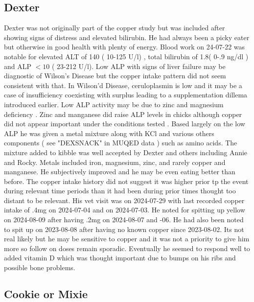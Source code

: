 \mjmcasetab

\subsection{Dexter}

\mjmdextercu

Dexter was not originally part of the copper study  but was included after
showing signs of distress and elevated bilirubin.  
He had always been a picky eater but otherwise in good
health with plenty of energy. 
Blood work on 24-07-22
was notable for elevated ALT of 140 ( 10-125 U/l) , total bilirubin
of 1.8( 0-.9 ng/dl ) and ALP $<10$ ( 23-212 U/l). 
Low ALP with signs of liver failure may be diagnostic of
Wilson's Disease but the copper intake pattern did not seem
consistent with that. In Wilson'd Disease, ceruloplasmin is low
\cite{PMC9768184}
and it may be a case of insufficiency coexisting with surplus
leading to a supplementation dillema introduced earlier.
Low ALP activity may be due to  zinc and magnesium  deficiency
\cite{Ray_Singh_Jena_Alkaline_Phosphatase_}.
Zinc and manganese did raise ALP levels in chicks
although copper did not appear important under the conditions tested
\cite{Santos_Gonccalves_Neira_Effects_Supplementation_2023}.
Based largely on the low ALP he was given a metal mixture along
with KCl and various others components ( see "DEXSNACK" in MUQED data )
 such as amino acids.
The mixture added to kibble was well accepted by Dexter and 
others including Annie and Rocky. Metals included iron, magnesium,
zinc, and rarely copper and manganese. He subjectively improved
and he may be even eating better than before. 
The copper intake history did not suggest it was higher
prior tp the event during relevant time periods  than it had 
been during prior times thought too distant to be relevant. 
His vet visit was on 2024-07-29 with last recorded copper 
intake of .4mg on 2024-07-04 and on 2024-07-03. He noted
for spitting up yellow on 2024-08-09 after having .2mg on
2024-08-07 and -06. He had also been noted to spit up on 2023-08-08
after having no known copper since 2023-08-02.
Its not real likely but he may be sensitive to copper and it was 
not a priority to give him more so follow on doses remain sporadic. 
Eventually he seemed to respond well to added vitamin D which was thought
important due to bumps on his ribs and possible bone problems.

\subsection{Cookie or Mixie}

